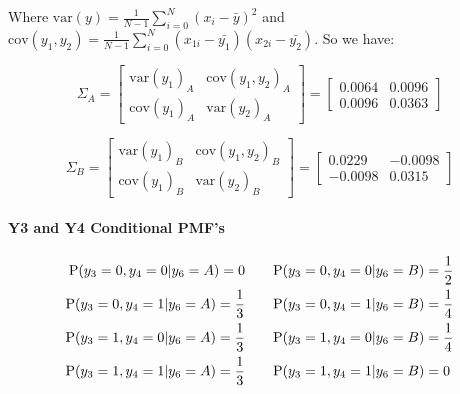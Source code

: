 \documentclass[12pt]{article}
\begin{document}
\begin{enumerate}[leftmargin=\labelsep]
\begin{enumerate}
        Where $\textrm{var}(y) = \frac{1}{N-1}\sum_{i = 0}^{N}(x_i - \bar{y})^2$ and $\textrm{cov}(y_1, y_2) = \frac{1}{N-1}\sum_{i = 0}^{N}(x_{1i} - \bar{y_1})(x_{2i} - \bar{y_2})$.
        So we have:

        \begin{equation}
            \Sigma_A =
            \begin{bmatrix}
                \textrm{var}(y_1)_A & \textrm{cov}(y_1, y_2)_A \\
                \textrm{cov}(y_1)_A & \textrm{var}(y_2)_A
            \end{bmatrix}=
            \begin{bmatrix}
                0.0064 & 0.0096 \\
                0.0096 & 0.0363
            \end{bmatrix}
        \end{equation}

        \begin{equation}
            \Sigma_B =
            \begin{bmatrix}
                \textrm{var}(y_1)_B & \textrm{cov}(y_1, y_2)_B \\
                \textrm{cov}(y_1)_B & \textrm{var}(y_2)_B
            \end{bmatrix}=
            \begin{bmatrix}
                0.0229 & -0.0098 \\
                -0.0098 & 0.0315
            \end{bmatrix}
        \end{equation}

        \paragraph{Y3 and Y4 Conditional PMF's}

        \begin{equation}
        \begin{split}
            \textrm{P}(y_3 = 0, y_4 = 0 | y_6 = A) = 0 &\qquad \textrm{P}(y_3 = 0, y_4 = 0 | y_6 = B) = \frac{1}{2} \\
            \textrm{P}(y_3 = 0, y_4 = 1 | y_6 = A) = \frac{1}{3} &\qquad \textrm{P}(y_3 = 0, y_4 = 1 | y_6 = B) = \frac{1}{4} \\
            \textrm{P}(y_3 = 1, y_4 = 0 | y_6 = A) = \frac{1}{3} &\qquad \textrm{P}(y_3 = 1, y_4 = 0 | y_6 = B) = \frac{1}{4} \\
            \textrm{P}(y_3 = 1, y_4 = 1 | y_6 = A) = \frac{1}{3} &\qquad \textrm{P}(y_3 = 1, y_4 = 1 | y_6 = B) = 0
        \end{split}
        \end{equation}


\end{enumerate}
\end{enumerate}
\end{document}

